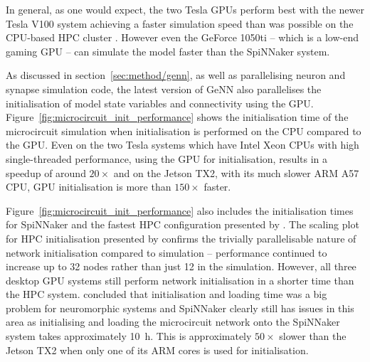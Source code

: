 \documentclass[utf8]{frontiersSCNS} %
\begin{document}
In general, as one would expect, the two Tesla GPUs perform best with the newer Tesla V100 system achieving a faster simulation speed than was possible on the CPU-based HPC cluster \citep{VanAlbada2018}.
However even the GeForce 1050ti -- which is a low-end gaming GPU -- can simulate the model faster than the SpiNNaker system.

As discussed in section~\ref{sec:method/genn}, as well as parallelising neuron and synapse simulation code, the latest version of GeNN also parallelises the initialisation of model state variables and connectivity using the GPU.
Figure~\ref{fig:microcircuit_init_performance} shows the initialisation time of the microcircuit simulation when initialisation is performed on the CPU compared to the GPU.
Even on the two Tesla systems which have Intel Xeon CPUs with high single-threaded performance, using the GPU for initialisation, results in a speedup of around $20\times$ and on the Jetson TX2, with its much slower ARM A57 CPU, GPU initialisation is more than $150\times$ faster.

Figure~\ref{fig:microcircuit_init_performance} also includes the initialisation times for SpiNNaker and the fastest HPC configuration presented by \citet{VanAlbada2018}.
The scaling plot for HPC initialisation presented by \citeauthor{VanAlbada2018} confirms the trivially parallelisable nature of network initialisation compared to simulation -- performance continued to increase up to 32 nodes rather than just 12 in the simulation.
However, all three desktop GPU systems still perform network initialisation in a shorter time than the HPC system.
\citet{Diamond2018} concluded that initialisation and loading time was a big problem for neuromorphic systems and SpiNNaker clearly still has issues in this area as initialising and loading the microcircuit network onto the SpiNNaker system takes approximately \SI{10}{\hour}.
This is approximately $50\times$ slower than the Jetson TX2 when only one of its ARM cores is used for initialisation.
\end{document}

